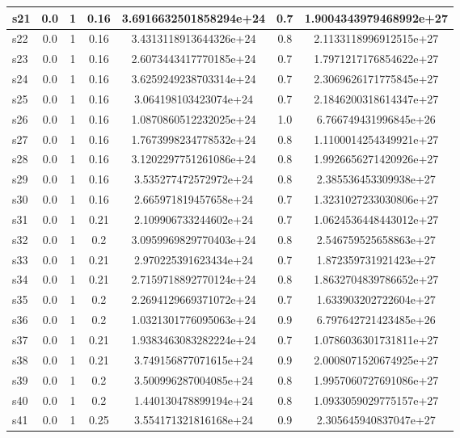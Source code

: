 \documentclass{article}
\begin{document}
\begin{tabular}{|l|c|c|c|c|c|c|}
\hline
s21 &0.0 & 1 & 0.16 & 3.6916632501858294e+24 & 0.7 & 1.9004343979468992e+27\\
\hline
s22 &0.0 & 1 & 0.16 & 3.4313118913644326e+24 & 0.8 & 2.1133118996912515e+27\\
\hline
s23 &0.0 & 1 & 0.16 & 2.6073443417770185e+24 & 0.7 & 1.7971217176854622e+27\\
\hline
s24 &0.0 & 1 & 0.16 & 3.6259249238703314e+24 & 0.7 & 2.3069626171775845e+27\\
\hline
s25 &0.0 & 1 & 0.16 & 3.064198103423074e+24 & 0.7 & 2.1846200318614347e+27\\
\hline
s26 &0.0 & 1 & 0.16 & 1.0870860512232025e+24 & 1.0 & 6.766749431996845e+26\\
\hline
s27 &0.0 & 1 & 0.16 & 1.7673998234778532e+24 & 0.8 & 1.1100014254349921e+27\\
\hline
s28 &0.0 & 1 & 0.16 & 3.1202297751261086e+24 & 0.8 & 1.9926656271420926e+27\\
\hline
s29 &0.0 & 1 & 0.16 & 3.535277472572972e+24 & 0.8 & 2.385536453309938e+27\\
\hline
s30 &0.0 & 1 & 0.16 & 2.665971819457658e+24 & 0.7 & 1.3231027233030806e+27\\
\hline
s31 &0.0 & 1 & 0.21 & 2.109906733244602e+24 & 0.7 & 1.0624536448443012e+27\\
\hline
s32 &0.0 & 1 & 0.2 & 3.0959969829770403e+24 & 0.8 & 2.546759525658863e+27\\
\hline
s33 &0.0 & 1 & 0.21 & 2.970225391623434e+24 & 0.7 & 1.872359731921423e+27\\
\hline
s34 &0.0 & 1 & 0.21 & 2.7159718892770124e+24 & 0.8 & 1.8632704839786652e+27\\
\hline
s35 &0.0 & 1 & 0.2 & 2.2694129669371072e+24 & 0.7 & 1.633903202722604e+27\\
\hline
s36 &0.0 & 1 & 0.2 & 1.0321301776095063e+24 & 0.9 & 6.797642721423485e+26\\
\hline
s37 &0.0 & 1 & 0.21 & 1.9383463083282224e+24 & 0.7 & 1.0786036301731811e+27\\
\hline
s38 &0.0 & 1 & 0.21 & 3.749156877071615e+24 & 0.9 & 2.0008071520674925e+27\\
\hline
s39 &0.0 & 1 & 0.2 & 3.500996287004085e+24 & 0.8 & 1.9957060727691086e+27\\
\hline
s40 &0.0 & 1 & 0.2 & 1.440130478899194e+24 & 0.8 & 1.0933059029775157e+27\\
\hline
s41 &0.0 & 1 & 0.25 & 3.554171321816168e+24 & 0.9 & 2.305645940837047e+27\\

\end{tabular}
\end{document}
